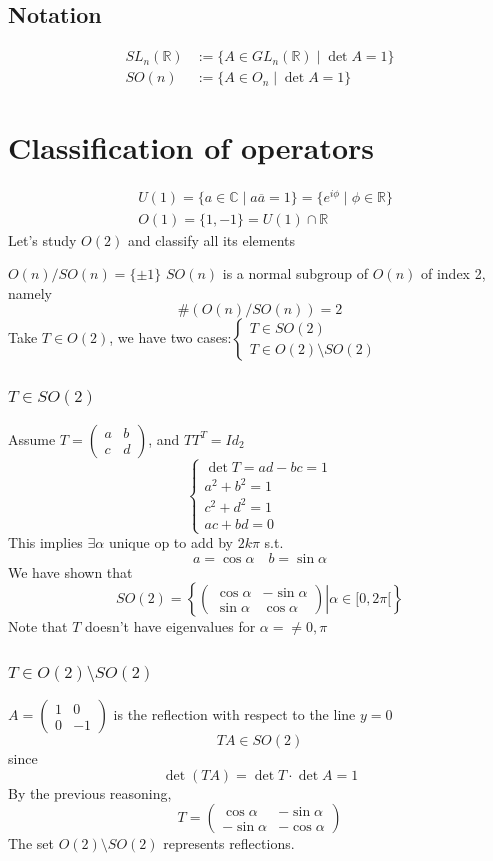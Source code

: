 \documentclass{book}
\newcommand{\leftbracket}{[}
\begin{document}
\section{Notation}
$$\begin{aligned}
    SL_n(\mathbb{R})&:=\{A\in GL_n(\mathbb{R})\mid \det A=1\}\\
    SO(n)&:=\{A\in O_n\mid\det A=1\}
\end{aligned}$$
\chapter{Classification of operators}
$$\begin{aligned}
    &U(1)=\{a\in \mathbb{C}\mid a\overline{a}=1\}=\{e^{i\phi}\mid \phi\in \mathbb{R}\}\\
    &O(1)=\{1,-1\}=U(1)\cap\mathbb{R}
\end{aligned}$$
Let's study $O(2)$ and classify all its elements

$O(n)/SO(n)=\{\pm1\}$ $SO(n)$ is a normal subgroup of $O(n)$ of index 2, namely $$\#(O(n)/SO(n))=2$$
Take $T\in O(2)$, we have two cases:$\begin{cases}
    T\in SO(2)\\T\in O(2)\setminus SO(2)
\end{cases}$
\subsection{$T\in SO(2)$}
Assume $T=\begin{pmatrix}
    a&b\\c&d
\end{pmatrix}$, and $TT^T=Id_2$
$$\begin{cases}
    \det T=ad-bc=1\\a^2+b^2=1\\c^2+d^2=1\\ac+bd=0
\end{cases}$$
This implies $\exists\alpha$ unique op to add by $2k\pi$ s.t.$$a=\cos\alpha\quad b=\sin\alpha$$
We have shown that
$$SO(2)=\left\{\left.\begin{pmatrix}
    \cos\alpha&-\sin\alpha\\\sin\alpha&\cos\alpha
\end{pmatrix}\right| \alpha\in \leftbracket 0,2\pi\leftbracket\right\}$$
Note that $T$ doesn't have eigenvalues for $\alpha=\neq 0,\pi$
\subsection{$T\in O(2)\setminus SO(2)$}
$A=\begin{pmatrix}
    1&0\\0&-1
\end{pmatrix}$ is the reflection with respect to the line $y=0$$$TA\in SO(2)$$since $$\det(TA)=\det T\cdot\det A=1$$
By the previous reasoning,$$T=\begin{pmatrix}
    \cos\alpha&-\sin\alpha\\-\sin\alpha&-\cos\alpha
\end{pmatrix}$$
The set $O(2)\setminus SO(2)$ represents reflections.
\end{document}
